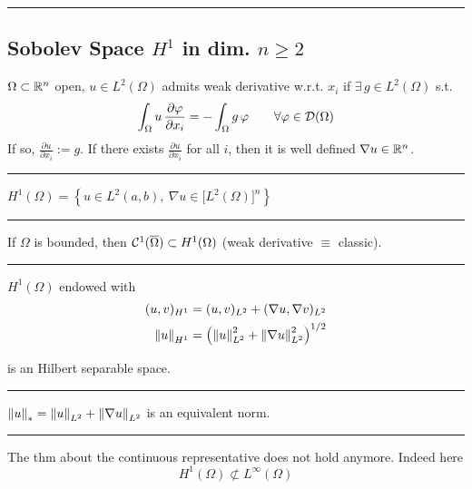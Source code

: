 \rule{0.31\textwidth}{0.2pt}


\subsection{\texorpdfstring{\color{red}Sobolev Space \texorpdfstring{$H^1$}{C} in dim. \texorpdfstring{$n\geq 2$}{C}}{}}


$\Omega\subset \mathbb{R}^n$ open, $u\in L^2(\Omega)$ admits weak derivative w.r.t. $x_i$ if $\exists\,g\in L^2(\Omega)$ s.t.
\begin{equation*}
\int_\Omega u\,\frac{\partial\varphi}{\partial x_i}=-\int_\Omega g\,\varphi\qquad\forall \varphi\in \mathcal{D}(\Omega)
\end{equation*}
If so, $\frac{\partial u}{\partial x_i} :=g$. If there exists $\frac{\partial u}{\partial x_i}$ for all $i$, then it is well defined $\nabla u\in\mathbb{R}^n$. 

\rule{0.31\textwidth}{0.2pt}
\smallskip

$H^1(\Omega) = \left\{ u\in L^2(a,b),\ \nabla u\in\big[ L^2(\Omega) \big]^n \right\}$

\rule{0.31\textwidth}{0.2pt}
\smallskip

If $\Omega$ is bounded, then $\mathcal{C}^1(\overline{\Omega})\subset H^1(\Omega)$ (weak derivative $\equiv$ classic).

\rule{0.31\textwidth}{0.2pt}
\smallskip

$H^1(\Omega)$ endowed with
\begin{align*}
(u,v)_{H^1}&=(u,v)_{L^2}+(\nabla u,\nabla v)_{L^2} \\
\left\lVert u \right\rVert_{H^1}&=\left( \left\lVert u \right\rVert^2_{L^2}+\left\lVert \nabla u \right\rVert^2_{L^2} \right)^{1/2}
\end{align*}

is an Hilbert separable space.

\rule{0.31\textwidth}{0.2pt}
\smallskip

$\left\lVert u \right\rVert_{*}=\left\lVert u \right\rVert_{L^2}+\left\lVert \nabla u \right\rVert
_{L^2}$ is an equivalent norm.

\rule{0.31\textwidth}{0.2pt}
\smallskip

The thm about the continuous representative does not hold anymore. Indeed here
\begin{equation*}
H^1(\Omega)\not\subset L^\infty(\Omega)
\end{equation*}

